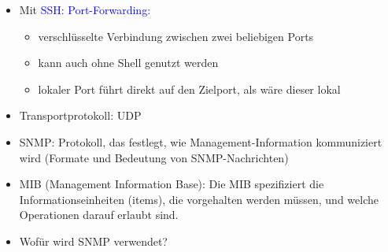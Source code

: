 \begin{itemize}
    \item Mit \textcolor{blue}{SSH: Port-Forwarding:}
    \begin{itemize}
        \item verschlüsselte Verbindung zwischen zwei beliebigen Ports
        \item kann auch ohne Shell genutzt werden
        \item lokaler Port führt direkt auf den Zielport, als wäre dieser lokal
    \end{itemize}
\end{itemize}

\begin{itemize}
    \item Transportprotokoll: UDP
    \item SNMP: Protokoll, das festlegt, wie Management-Information kommuniziert wird (Formate und Bedeutung von SNMP-Nachrichten)
    \item MIB (Management Information Base): Die MIB spezifiziert die Informationseinheiten (items), die vorgehalten werden müssen, und welche Operationen darauf erlaubt sind.
    \item {} Wofür wird SNMP verwendet?
\end{itemize}